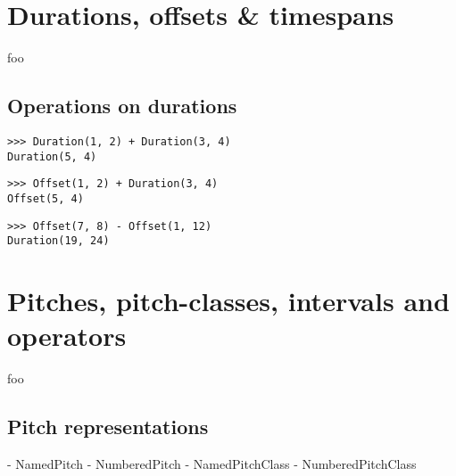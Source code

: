 \section{Durations, offsets \& timespans}

foo

\subsection{Operations on durations}

\begin{comment}
<abjad>
Duration(1, 2) + Duration(3, 4)
Offset(1, 2) + Duration(3, 4)
Offset(7, 8) - Offset(1, 12)
</abjad>
\end{comment}

\begin{singlespacing}
\vspace{-0.5\baselineskip}
\begin{lstlisting}
>>> Duration(1, 2) + Duration(3, 4)
Duration(5, 4)
\end{lstlisting}
\begin{lstlisting}
>>> Offset(1, 2) + Duration(3, 4)
Offset(5, 4)
\end{lstlisting}
\begin{lstlisting}
>>> Offset(7, 8) - Offset(1, 12)
Duration(19, 24)
\end{lstlisting}
\end{singlespacing}

\section{Pitches, pitch-classes, intervals and operators}

foo

\subsection{Pitch representations}

\begin{markdown}
- NamedPitch
- NumberedPitch
- NamedPitchClass
- NumberedPitchClass
\end{markdown}

